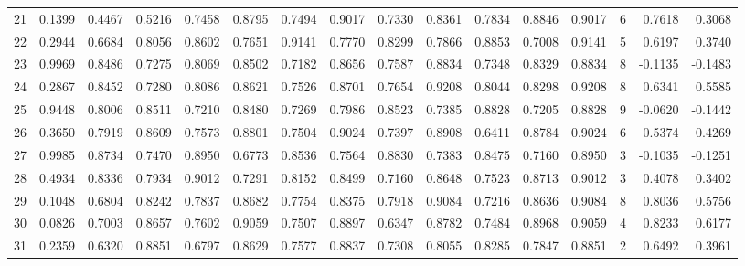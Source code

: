 \begin{tabular}{lrrrrrrrrrrrrrrr}
21  &      0.1399 &  0.4467 &  0.5216 &  0.7458 &  0.8795 &  0.7494 &  0.9017 &  0.7330 &  0.8361 &  0.7834 &   0.8846 &     0.9017 &      6 &                    0.7618 &                     0.3068 \\
22  &      0.2944 &  0.6684 &  0.8056 &  0.8602 &  0.7651 &  0.9141 &  0.7770 &  0.8299 &  0.7866 &  0.8853 &   0.7008 &     0.9141 &      5 &                    0.6197 &                     0.3740 \\
23  &      0.9969 &  0.8486 &  0.7275 &  0.8069 &  0.8502 &  0.7182 &  0.8656 &  0.7587 &  0.8834 &  0.7348 &   0.8329 &     0.8834 &      8 &                   -0.1135 &                    -0.1483 \\
24  &      0.2867 &  0.8452 &  0.7280 &  0.8086 &  0.8621 &  0.7526 &  0.8701 &  0.7654 &  0.9208 &  0.8044 &   0.8298 &     0.9208 &      8 &                    0.6341 &                     0.5585 \\
25  &      0.9448 &  0.8006 &  0.8511 &  0.7210 &  0.8480 &  0.7269 &  0.7986 &  0.8523 &  0.7385 &  0.8828 &   0.7205 &     0.8828 &      9 &                   -0.0620 &                    -0.1442 \\
26  &      0.3650 &  0.7919 &  0.8609 &  0.7573 &  0.8801 &  0.7504 &  0.9024 &  0.7397 &  0.8908 &  0.6411 &   0.8784 &     0.9024 &      6 &                    0.5374 &                     0.4269 \\
27  &      0.9985 &  0.8734 &  0.7470 &  0.8950 &  0.6773 &  0.8536 &  0.7564 &  0.8830 &  0.7383 &  0.8475 &   0.7160 &     0.8950 &      3 &                   -0.1035 &                    -0.1251 \\
28  &      0.4934 &  0.8336 &  0.7934 &  0.9012 &  0.7291 &  0.8152 &  0.8499 &  0.7160 &  0.8648 &  0.7523 &   0.8713 &     0.9012 &      3 &                    0.4078 &                     0.3402 \\
29  &      0.1048 &  0.6804 &  0.8242 &  0.7837 &  0.8682 &  0.7754 &  0.8375 &  0.7918 &  0.9084 &  0.7216 &   0.8636 &     0.9084 &      8 &                    0.8036 &                     0.5756 \\
30  &      0.0826 &  0.7003 &  0.8657 &  0.7602 &  0.9059 &  0.7507 &  0.8897 &  0.6347 &  0.8782 &  0.7484 &   0.8968 &     0.9059 &      4 &                    0.8233 &                     0.6177 \\
31  &      0.2359 &  0.6320 &  0.8851 &  0.6797 &  0.8629 &  0.7577 &  0.8837 &  0.7308 &  0.8055 &  0.8285 &   0.7847 &     0.8851 &      2 &                    0.6492 &                     0.3961 \\

\end{tabular}
